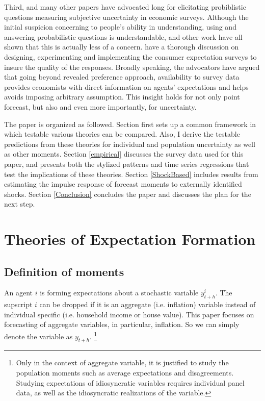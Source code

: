 \documentclass[]{article}
\begin{document}
	Third, \citet{manski2004measuring} and many other papers have advocated long for elicitating probiblistic questions measuring subjective uncertainty in economic surveys. Although the initial suspicion concerning to people's ability in understanding, using and answering probabilistic questions is understandable, \citet{bertrand2001people}and other work have all shown that this is actually less of a concern. \citet{armantier2017overview} have a thorough discussion on designing, experimenting and implementing the consumer expectation surveys to insure the quality of the responses. Broadly speaking, the advocators have argued that going beyond revealed preference approach, availability to survey data provides economists with direct information on agents' expectations and helps avoids imposing arbitrary assumption.  This insight holds for not only point forecast, but also and even more importantly, for uncertainty.
	
	The paper is organized as followed. Section \label{theory} first sets up a common framework in which testable various theories can be compared. Also, I derive the testable predictions from these theories for individual and population uncertainty as well as other moments. Section \ref{empirical} discusses the survey data used for this paper, and presents both the stylized patterns and time series regressions that test the implications of these theories.   Section \ref{ShockBased} includes results from estimating the impulse response of forecast moments to externally identified shocks.  Section \ref{Conclusion} concludes the paper and discusses the plan for the next step. 
	
	\section{Theories of Expectation Formation}\label{theory}
	
	\subsection{Definition of moments}
	
	An agent $i$ is forming expectations about a stochastic variable $y^i_{t+h}$. The supscript $i$ can be dropped if it is an aggregate (i.e. inflation) variable instead of individual specific  (i.e. household income or house value). This paper focuses on forecasting of aggregate variables, in particular, inflation. So we can simply denote the variable as $y_{t+h}$.  \footnote{Only in the context of aggregate variable, it is justified to study the population moments such as average expectations and disagreements. Studying expectations of idiosyncratic variables requires individual panel data, as well as the idiosyncratic realizations of the variable. }
	
\end{document}
